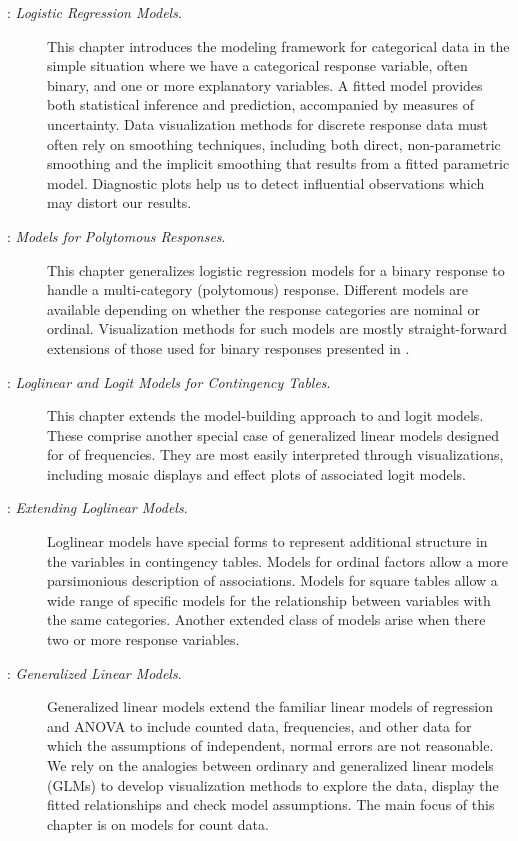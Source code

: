 \begin{description}
\item[: \emph{Logistic Regression Models}.]
This chapter introduces the modeling framework for categorical data in the simple
situation where we have a categorical response variable, often binary, and one or
more explanatory variables. A fitted model provides both statistical
inference and prediction, accompanied by measures of uncertainty.
Data visualization methods for discrete response data must often rely
on smoothing techniques, including both direct, non-parametric smoothing
and the implicit smoothing that results from a fitted parametric model.
Diagnostic plots help us to detect influential observations which may distort
our results.

\item[: \emph{Models for Polytomous Responses}.]
This chapter generalizes logistic regression models for a binary response to
handle a multi-category (polytomous) response.  Different models are available depending on
whether the response categories are nominal or ordinal.
Visualization methods for such models are mostly straight-forward extensions
of those used for binary responses presented in .

\item[: \emph{Loglinear and Logit Models for Contingency Tables}.]
This chapter extends the model-building approach to \loglin and logit
models. These comprise another special case of generalized linear models
designed for \ctabs of frequencies.  They
are most easily interpreted through
visualizations, including mosaic displays and effect plots of associated
logit models.  

\item[: \emph{Extending Loglinear Models}.]
Loglinear models have special forms to represent additional structure in the
variables in contingency tables.  Models for ordinal factors allow a more
parsimonious description of associations.  Models for square tables
allow a wide range of specific models for the relationship between
variables with the same categories.  Another extended class of
models arise when there two or more response variables.


\item[: \emph{Generalized Linear Models}.]
Generalized linear models extend the familiar linear models of
regression and ANOVA to
include counted data, frequencies, and other data for which the
assumptions of independent, normal errors are not reasonable.
We rely on the analogies between ordinary and generalized linear
models (GLMs) to develop visualization methods to explore the data,
display the fitted relationships and check model assumptions.
The main focus of this chapter is on models for count data.

\end{description}






